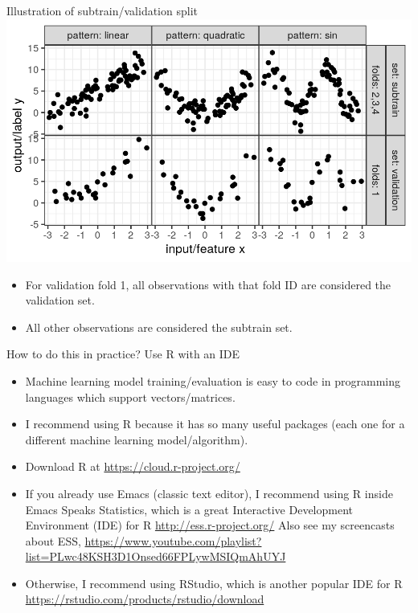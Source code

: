 \documentclass{article}
\begin{document}
{Illustration of subtrain/validation split}
\includegraphics[width=\textwidth]{figure-overfitting-data-sets}
\begin{itemize}
\item For validation fold 1, all observations with that fold ID are
  considered the validation set.
\item All other observations are considered the subtrain set.
\end{itemize}

{How to do this in practice? Use R with an IDE}
\begin{itemize}
\item Machine learning model training/evaluation is easy to code in
  programming languages which support vectors/matrices.
\item I recommend using R because it has so many useful packages
  (each one for a different machine learning model/algorithm).
\item Download R at \url{https://cloud.r-project.org/}
\item If you already use Emacs (classic text editor), I recommend
  using R inside Emacs Speaks Statistics, which is a great
  Interactive Development Environment (IDE) for R
  \url{http://ess.r-project.org/} Also see my screencasts about ESS,
  \url{https://www.youtube.com/playlist?list=PLwc48KSH3D1Onsed66FPLywMSIQmAhUYJ}
\item Otherwise, I recommend using RStudio, which is another popular
  IDE for R
  \url{https://rstudio.com/products/rstudio/download}
\end{itemize}
\end{document}
